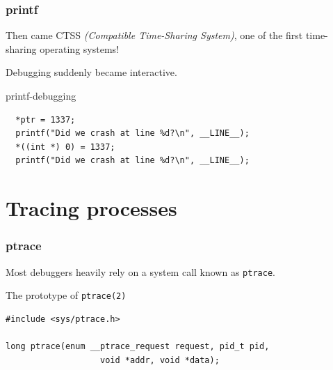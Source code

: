 \documentclass{beamer} %
\newcommand*{\ptrace}{\texttt{ptrace}}
\newcommand*{\ptraceman}{\texttt{ptrace(2)}}
\begin{document}
\begin{frame}[fragile]
\frametitle{printf}

Then came CTSS \textit{(Compatible Time-Sharing System)}, one of the first time-sharing operating
systems! \par
\vspace{.5cm}
Debugging suddenly became interactive.

\begin{block}{printf-debugging}
\begin{verbatim}
  *ptr = 1337;
  printf("Did we crash at line %d?\n", __LINE__);
  *((int *) 0) = 1337;
  printf("Did we crash at line %d?\n", __LINE__);
\end{verbatim}
\end{block}

\end{frame}


\section{Tracing processes}

\begin{frame}[fragile]
\frametitle{ptrace}

Most debuggers heavily rely on a system call known as \ptrace.
\vskip1cm
\begin{block}{The prototype of \ptraceman}
\begin{verbatim}
#include <sys/ptrace.h>

long ptrace(enum __ptrace_request request, pid_t pid,
                   void *addr, void *data);
\end{verbatim}
\end{block}
\end{frame}
\end{document}

